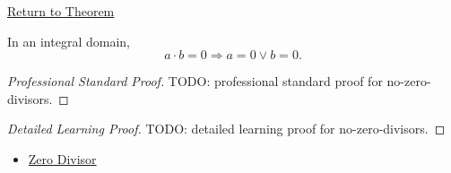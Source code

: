 \newpage
{}
\label{prf:no-zero-divisors}

\begin{remark*}[Return]
\hyperref[thm:no-zero-divisors]{Return to Theorem}
\end{remark*}

\begin{theorem*}
In an integral domain,
\[
a\cdot b=0 \Longrightarrow a=0 \lor b=0.
\]
\end{theorem*}

\begin{proof}[Professional Standard Proof]
\LRAProofBodyStart
TODO: professional standard proof for no-zero-divisors.
\end{proof}

\begin{proof}[Detailed Learning Proof]
\LRAProofBodyStart
TODO: detailed learning proof for no-zero-divisors.
\end{proof}

\begin{remark*}
\end{remark*}

\begin{dependencies}
\begin{itemize}
  \item \hyperref[def:zero-divisor]{Zero Divisor}
\end{itemize}
\end{dependencies}

\clearpage
